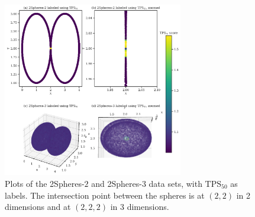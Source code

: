 \begin{figure}[H]
    \centering
    \includegraphics[width=0.7\textwidth]{thesis/figures/two-spheres-2d-3d-tps-scores.pdf}
    \caption{Plots of the 2Spheres-$2$ and 2Spheres-$3$ data sets, with $\text{TPS}_{50}$ as labels. The intersection point between the spheres is at $(2, 2)$ in 2 dimensions and at $(2, 2, 2)$ in 3 dimensions.}
    \label{fig:two-spheres-2d-3d-tps-scores}
\end{figure}

